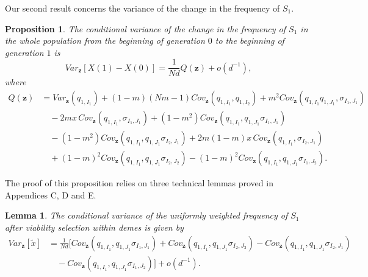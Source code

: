 \documentclass[11pt]{article}
\newtheorem{lemma}{Lemma}
\newtheorem{Proposition}{Proposition}
\begin{document}
Our second result concerns the variance of the change in the frequency of $S_1$.

\begin{Proposition}\label{Proposition2}
The conditional variance of the change in the frequency of $S_1$ in the whole population from the beginning of generation $0$ to the beginning of generation $1$ is  
\begin{equation}\label{sec2-eq17}
Var_{\mathbf{z}}\left[X(1)-X(0)\right]=\frac{1}{Nd}Q(\mathbf{z})+o\left(d^{-1}\right),
\end{equation}
where
\begin{align}\label{sec2-eq18}
Q(\mathbf{z})&=Var_{\mathbf{z}}(q_{1,I_1})+(1-m)(Nm-1)Cov_{\mathbf{z}}(q_{1,I_1},q_{1,I_2})+m^2Cov_{\mathbf{z}}(q_{1,I_1}q_{1,J_1},\sigma_{I_1,J_1})\nonumber\\
&\quad-2mx\,Cov_{\mathbf{z}}(q_{1,I_1},\sigma_{I_1,J_1})
+(1-m^2)Cov_{\mathbf{z}}(q_{1,I_1},q_{1,J_1}\sigma_{I_1,J_1})\nonumber\\
&\quad-(1-m^2)Cov_{\mathbf{z}}(q_{1,I_1},q_{1,J_1}\sigma_{I_2,J_1})
+2m(1-m)x\,Cov_{\mathbf{z}}(q_{1,I_1},\sigma_{I_2,J_1})\nonumber\\
&\quad+(1-m)^2Cov_{\mathbf{z}}(q_{1,I_1},q_{1,J_1}\sigma_{I_2,J_2})-(1-m)^2Cov_{\mathbf{z}}(q_{1,I_1},q_{1,J_1}\sigma_{I_1,J_2}).
\end{align}
\end{Proposition}
The proof of this proposition relies on three technical lemmas proved in Appendices C, D and E.


\begin{lemma}\label{lemma3}
The conditional variance of the uniformly weighted frequency of $S_1$ after viability selection within demes is given by
\begin{align}\label{sec2-eq19}
Var_{\mathbf{z}}\left[\tilde{x}\right]&=
\frac{1}{Nd}\Big[
Cov_{\mathbf{z}}(q_{1,I_1},q_{1,J_1}\sigma_{I_1,J_1})
+Cov_{\mathbf{z}}(q_{1,I_1},q_{1,J_1}\sigma_{I_2,J_2})
-Cov_{\mathbf{z}}(q_{1,I_1},q_{1,J_1}\sigma_{I_2,J_1})\nonumber\\
&\quad-Cov_{\mathbf{z}}(q_{1,I_1},q_{1,J_1}\sigma_{I_1,J_2})
\Big]+o(d^{-1}).
\end{align}
\end{lemma}
\end{document}
